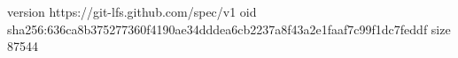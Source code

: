version https://git-lfs.github.com/spec/v1
oid sha256:636ca8b375277360f4190ae34dddea6cb2237a8f43a2e1faaf7c99f1dc7feddf
size 87544
